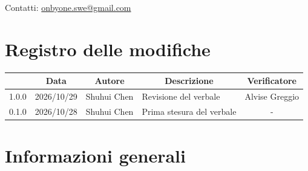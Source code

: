 \documentclass[11pt, a4paper]{article}
\begin{document}
\begin{titlepage}
    \vspace{0.5cm}

    {\large Contatti: \href{mailto:onbyone.swe@gmail.com}{onbyone.swe@gmail.com} }

\end{titlepage}

\section*{Registro delle modifiche}

\vspace{1cm}
\begin{center}
    \renewcommand{\arraystretch}{1.5}
    \begin{tabularx}{\textwidth}{|c|c|c|X|c|}
        \hline
        \rowcolor{gray!10}
        \multicolumn{1}{|c|}{\textbf{Versione}} &
        \multicolumn{1}{c|}{\textbf{Data}} &
        \multicolumn{1}{c|}{\textbf{Autore}} &
        \multicolumn{1}{c|}{\textbf{Descrizione}} &
        \multicolumn{1}{c|}{\textbf{Verificatore}} \\
        \hline
        1.0.0 & 2026/10/29 & Shuhui Chen & Revisione del verbale & Alvise Greggio\\
        \hline
        0.1.0 & 2026/10/28 & Shuhui Chen & Prima stesura del verbale & - \\
        \hline
    \end{tabularx}
\end{center}
\vfill
\newpage

\tableofcontents
\newpage

\section{Informazioni generali}
\end{document}
